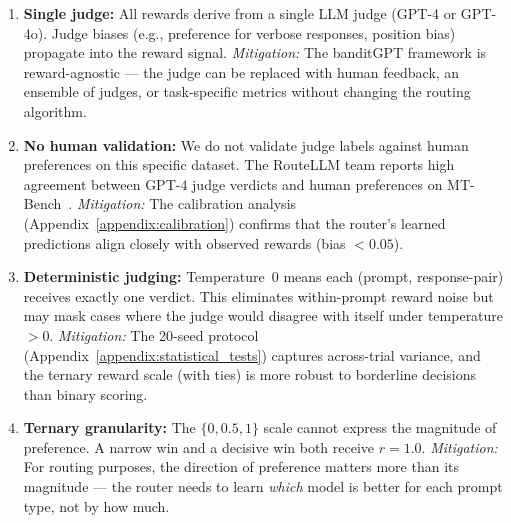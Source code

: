 \begin{enumerate}[leftmargin=*,noitemsep]
    \item \textbf{Single judge:} All rewards derive from a single LLM judge
          (GPT-4 or GPT-4o).  Judge biases (e.g., preference for verbose
          responses, position bias) propagate into the reward signal.
          \emph{Mitigation:} The banditGPT framework is reward-agnostic ---
          the judge can be replaced with human feedback, an ensemble of
          judges, or task-specific metrics without changing the routing
          algorithm.
    \item \textbf{No human validation:} We do not validate judge labels against
          human preferences on this specific dataset.  The RouteLLM team
          reports high agreement between GPT-4 judge verdicts and human
          preferences on MT-Bench~\cite{ong2024routellm}.  \emph{Mitigation:}
          The calibration analysis (Appendix~\ref{appendix:calibration})
          confirms that the router's learned predictions align closely
          with observed rewards (bias $< 0.05$).
    \item \textbf{Deterministic judging:} Temperature~0 means each
          (prompt, response-pair) receives exactly one verdict.  This
          eliminates within-prompt reward noise but may mask cases where the
          judge would disagree with itself under temperature $>0$.
          \emph{Mitigation:} The 20-seed protocol
          (Appendix~\ref{appendix:statistical_tests}) captures
          across-trial variance, and the ternary reward scale (with ties)
          is more robust to borderline decisions than binary scoring.
    \item \textbf{Ternary granularity:} The $\{0, 0.5, 1\}$ scale cannot
          express the magnitude of preference.  A narrow win and a decisive
          win both receive $r = 1.0$.  \emph{Mitigation:} For routing
          purposes, the direction of preference matters more than its
          magnitude --- the router needs to learn \emph{which} model is
          better for each prompt type, not by how much.
\end{enumerate}
